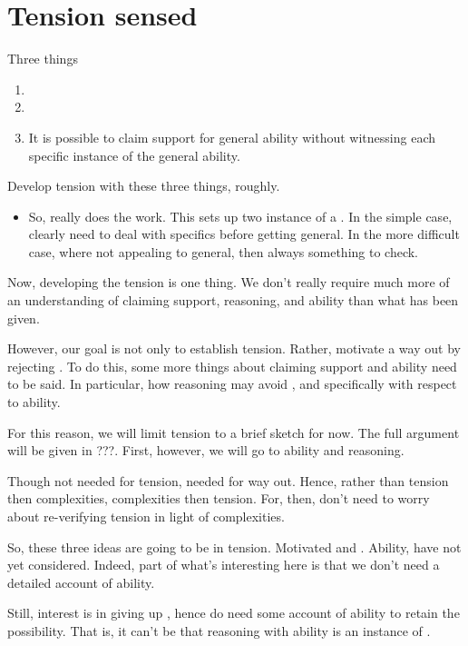 \chapter{Tension sensed}

\begin{note}
  Three things
  \begin{enumerate}
  \item \ideaCS{}
  \item \ESU{}
  \item It is possible to claim support for general ability without witnessing each specific instance of the general ability.
  \end{enumerate}

  Develop tension with these three things, roughly.

  \begin{itemize}
  \item So, \ideaCS{} really does the work.
    This sets up two instance of a \requ{}.
    In the simple case, clearly need to deal with specifics before getting general.
    In the more difficult case, where not appealing to general, then always something to check.
  \end{itemize}
\end{note}

\begin{note}
  Now, developing the tension is one thing.
  We don't really require much more of an understanding of claiming support, reasoning, and ability than what has been given.

  However, our goal is not only to establish tension.
  Rather, motivate a way out by rejecting \ESU{}.
  To do this, some more things about claiming support and ability need to be said.
  In particular, how reasoning may avoid \ESU{}, and specifically with respect to ability.

  For this reason, we will limit tension to a brief sketch for now.
  The full argument will be given in {\color{red} ???}.
  First, however, we will go to ability and reasoning.

  Though not needed for tension, needed for way out.
  Hence, rather than tension then complexities, complexities then tension.
  For, then, don't need to worry about re-verifying tension in light of complexities.
\end{note}

\begin{note}
  So, these three ideas are going to be in tension.
  Motivated \ideaCS{} and \ESU{}.
  Ability, have not yet considered.
  Indeed, part of what's interesting here is that we don't need a detailed account of ability.

  Still, interest is in giving up \ESU{}, hence do need some account of ability to retain the possibility.
  That is, it can't be that reasoning with ability is an instance of \ESU{}.
  
\end{note}

